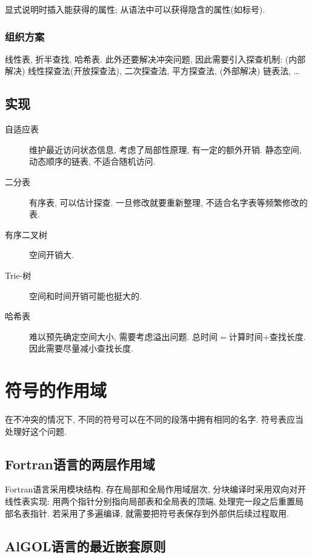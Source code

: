                 显式说明时插入能获得的属性; 从语法中可以获得隐含的属性(如标号). 

            \subsubsection{组织方案} 
            
                线性表, 折半查找, 哈希表. 此外还要解决冲突问题, 因此需要引入探查机制: (内部解决) 线性探查法(开放探查法), 二次探查法, 平方探查法, (外部解决) 链表法, \ldots

        \subsection{实现}

            \begin{description}
                \item[自适应表] 维护最近访问状态信息, 考虑了局部性原理, 有一定的额外开销. 静态空间, 动态顺序的链表, 不适合随机访问.
                \item[二分表] 有序表, 可以估计探查. 一旦修改就要重新整理, 不适合名字表等频繁修改的表.
                \item[有序二叉树] 空间开销大.
                \item[Trie-树] 空间和时间开销可能也挺大的.
                \item[哈希表] 难以预先确定空间大小, 需要考虑溢出问题. 总时间$=$计算时间$+$查找长度. 因此需要尽量减小查找长度.
            \end{description}

    \section{符号的作用域}

        在不冲突的情况下, 不同的符号可以在不同的段落中拥有相同的名字. 符号表应当处理好这个问题.

        \subsection{Fortran语言的两层作用域}

            Fortran语言采用模块结构, 存在局部和全局作用域层次, 分块编译时采用双向对开线性表实现: 用两个指针分别指向局部表和全局表的顶端, 处理完一段之后重置局部名表指针. 若采用了多遍编译, 就需要把符号表保存到外部供后续过程取用.

        \subsection{AlGOL语言的最近嵌套原则}


